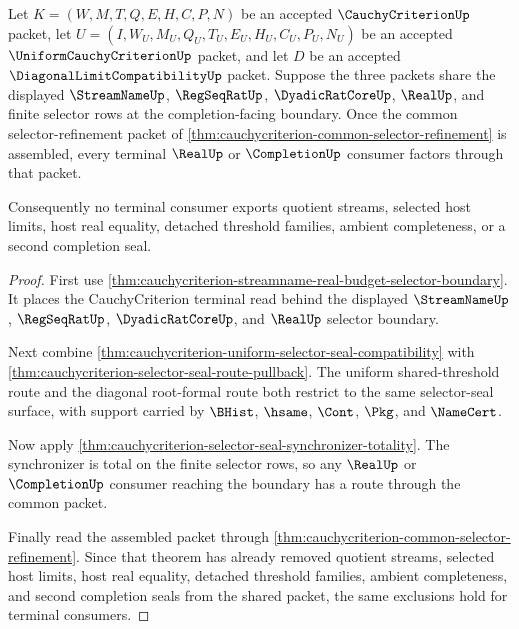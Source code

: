 \begin{theorem}
\label{thm:cauchycriterion-selector-refinement-terminal-nonescape}
Let $K=(W,M,T,Q,E,H,C,P,N)$ be an accepted $\CauchyCriterionUp$ packet, let $U=(I,W_U,M_U,Q_U,T_U,E_U,H_U,C_U,P_U,N_U)$ be an accepted $\UniformCauchyCriterionUp$ packet, and let $D$ be an accepted $\DiagonalLimitCompatibilityUp$ packet. Suppose the three packets share the displayed $\StreamNameUp$, $\RegSeqRatUp$, $\DyadicRatCoreUp$, $\RealUp$, and finite selector rows at the completion-facing boundary. Once the common selector-refinement packet of \autoref{thm:cauchycriterion-common-selector-refinement} is assembled, every terminal $\RealUp$ or $\CompletionUp$ consumer factors through that packet.

Consequently no terminal consumer exports quotient streams, selected host limits, host real equality, detached threshold families, ambient completeness, or a second completion seal.
\end{theorem}
\begin{proof}
First use \autoref{thm:cauchycriterion-streamname-real-budget-selector-boundary}. It places the CauchyCriterion terminal read behind the displayed $\StreamNameUp$, $\RegSeqRatUp$, $\DyadicRatCoreUp$, and $\RealUp$ selector boundary.

Next combine \autoref{thm:cauchycriterion-uniform-selector-seal-compatibility} with \autoref{thm:cauchycriterion-selector-seal-route-pullback}. The uniform shared-threshold route and the diagonal root-formal route both restrict to the same selector-seal surface, with support carried by $\BHist$, $\hsame$, $\Cont$, $\Pkg$, and $\NameCert$.

Now apply \autoref{thm:cauchycriterion-selector-seal-synchronizer-totality}. The synchronizer is total on the finite selector rows, so any $\RealUp$ or $\CompletionUp$ consumer reaching the boundary has a route through the common packet.

Finally read the assembled packet through \autoref{thm:cauchycriterion-common-selector-refinement}. Since that theorem has already removed quotient streams, selected host limits, host real equality, detached threshold families, ambient completeness, and second completion seals from the shared packet, the same exclusions hold for terminal consumers.
\end{proof}

